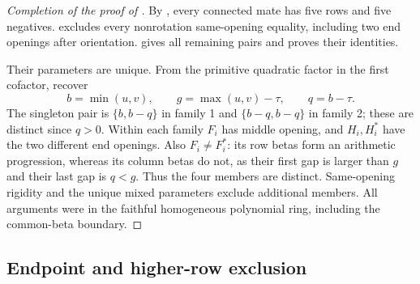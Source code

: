 \documentclass[11pt,a4paper]{amsart}
\numberwithin{equation}{section}
\theoremstyle{plain}
\theoremstyle{definition}
\begin{document}
\begin{proof}[Completion of the proof of ]
By , every connected mate has five rows and
five negatives.   excludes every
nonrotation same-opening equality, including two end openings after
orientation.   gives all remaining pairs
and proves their identities.  

Their parameters are unique.  From the primitive quadratic factor in
the first cofactor, recover
\[
 b=\min(u,v),\qquad
 g=\max(u,v)-\tau,\qquad q=b-\tau.
\]
The singleton pair is \(\{b,b-q\}\) in family 1 and
\(\{b-q,b-q\}\) in family 2; these are distinct since \(q>0\).  
Within each family \(F_i\) has middle opening, and \(H_i,H_i^*\)
have the two different end openings.  Also \(F_i\ne F_i^*\): its row
betas form an arithmetic progression, whereas its column betas do not,
as their first gap is larger than \(g\) and their last gap is \(q<g\).  
Thus the four members are distinct.  Same-opening rigidity and the
unique mixed parameters exclude additional members.  All arguments
were in the faithful homogeneous polynomial ring, including the
common-beta boundary.  
\end{proof}

\subsection{Endpoint and higher-row exclusion}\label{sec:five-borders}
\end{document}
